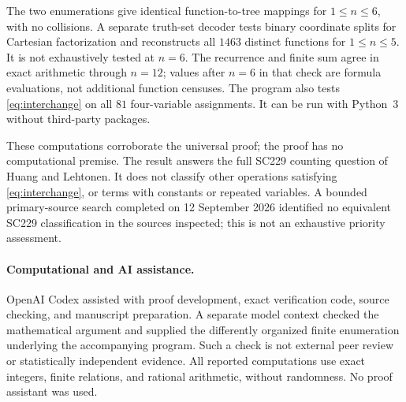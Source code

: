 \documentclass[11pt]{article}
\begin{document}
The two enumerations give identical function-to-tree mappings for
$1\leq n\leq6$, with no collisions. A separate truth-set decoder tests
binary coordinate splits for Cartesian factorization and reconstructs
all $1463$ distinct functions for $1\leq n\leq5$. It is not exhaustively
tested at $n=6$. The recurrence and finite sum agree in exact arithmetic
through $n=12$; values after $n=6$ in that check are formula evaluations,
not additional function censuses. The program also tests
\eqref{eq:interchange} on all $81$ four-variable assignments. It can be
run with Python~3 without third-party packages.

These computations corroborate the universal proof; the proof has no
computational premise. The result answers the full SC229 counting
question of Huang and Lehtonen. It does not classify other operations
satisfying \eqref{eq:interchange}, or terms with constants or repeated
variables. A bounded primary-source search completed on 12 September
2026 identified no equivalent SC229 classification in the sources
inspected; this is not an exhaustive priority assessment.

\paragraph{Computational and AI assistance.}
OpenAI Codex assisted with proof development, exact verification code,
source checking, and manuscript preparation. A separate model context
checked the mathematical argument and supplied the differently organized
finite enumeration underlying the accompanying program. Such a check is
not external peer review or statistically independent evidence. All
reported computations use exact integers, finite relations, and rational
arithmetic, without randomness. No proof assistant was used.



\end{document}
